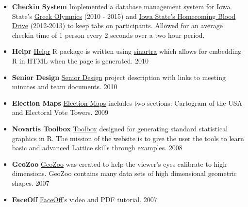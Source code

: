 \documentclass[oneside]{article}
\begin{document}
\begin{itemize}

  \item{\bf Checkin System} Implemented a database management system for Iowa State's \href{http://www.greekweek.barretschloerke.com/}{Greek Olympics} (2010 - 2015) and \href{http://www.homecoming.barretschloerke.com/}{Iowa State's Homecoming Blood Drive} (2012-2013) to keep tabs on participants.  Allowed for an average checkin time of 1 person every 2 seconds over a two hour period.

  \item{\bf Helpr} \href{http://github.com/hadley/helpr}{Helpr} {R} package is written using \href{http://github.com/hadley/sinartra}{sinartra} which allows for embedding R in HTML when the page is generated. 2010

  \item{\bf Senior Design}
  \href{http://seniord.ece.iastate.edu/dec1009/}{Senior Design} project description with links to meeting minutes and team documents. 2010

  \item{\bf Election Maps} \href{http://barretschloerke.com/Election/index.html}{Election Maps} includes two sections: Cartogram of the USA and Electoral Vote Towers. 2009

  \item{\bf Novartis Toolbox} \href{http://barretschloerke.com/Novartis/}{Toolbox} designed for generating standard statistical graphics in R. The mission of the website is to give the user the tools to learn basic and advanced Lattice skills through examples. 2008

  \item{\bf GeoZoo} \href{http://streaming.stat.iastate.edu/~dicook/geometric-data/}{GeoZoo} was created to help the viewer's eyes calibrate to high dimensions. GeoZoo contains many data sets of high dimensional geometric shapes. 2007

  \item{\bf FaceOff} \href{http://www.public.iastate.edu/~bigbear/FaceOff/index.html}{FaceOff}'s video and PDF tutorial. 2007

\end{itemize}
\end{document}
